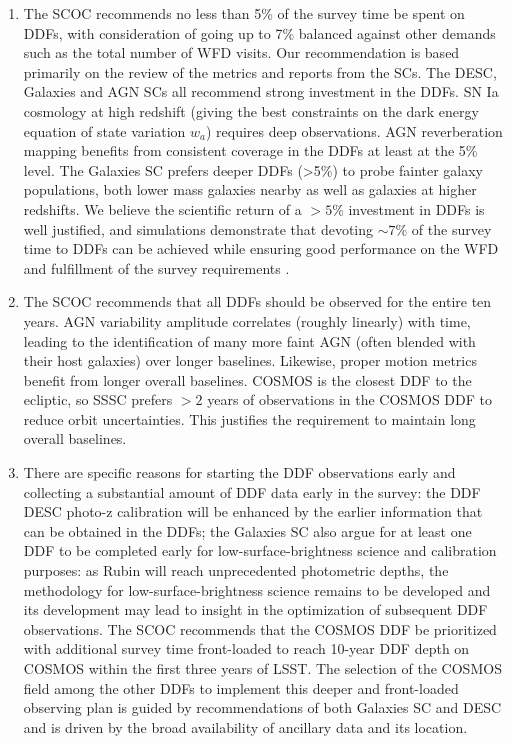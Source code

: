 \begin{enumerate} 
\item The SCOC recommends no less than 5\% of the survey time be spent on DDFs, with consideration of going up to 7\% balanced against other demands such as the total number of WFD visits. Our recommendation is based primarily on the review of the metrics and reports from the SCs. The DESC, Galaxies and AGN SCs all recommend strong investment in the DDFs. SN Ia cosmology at high redshift (giving the best constraints on the dark energy equation of state variation $w_a$) requires deep observations. AGN reverberation mapping benefits from consistent coverage in the DDFs at least at the 5\% level. The Galaxies SC prefers deeper DDFs (>5\%) to probe fainter galaxy populations, both lower mass galaxies nearby as well as galaxies at higher redshifts. We believe the scientific return of a $>5\%$ investment in DDFs is well justified, and simulations demonstrate that devoting $\sim7\%$ of the survey time to DDFs can be achieved while ensuring good performance on the WFD and fulfillment of the survey requirements .

\item The SCOC recommends that all DDFs should be observed for the entire ten years. AGN variability amplitude correlates (roughly linearly) with time, leading to the identification of many more faint AGN (often blended with their host galaxies) over longer baselines. Likewise, proper motion metrics benefit from longer overall baselines. COSMOS is the closest DDF to the ecliptic, so SSSC prefers $>2$ years of observations in the COSMOS DDF to reduce orbit uncertainties. 
This justifies the requirement to maintain long overall baselines.


\item There are specific reasons for starting the DDF observations early and collecting a substantial amount of DDF data early in the survey: the DDF DESC photo-z calibration will be enhanced by the earlier information that can be obtained in the DDFs; the Galaxies SC also argue for at least one DDF to be completed early for low-surface-brightness science and calibration purposes: as Rubin will reach unprecedented photometric depths, the methodology for low-surface-brightness science remains to be developed and its development may lead to insight in the optimization of subsequent DDF observations. 
The SCOC recommends that the COSMOS DDF be prioritized with additional survey time front-loaded to reach 10-year DDF depth on COSMOS within the first three years of LSST. The selection of the COSMOS field among the other DDFs to implement this deeper and front-loaded observing plan is guided by recommendations of both Galaxies SC and DESC and is driven by the broad availability of ancillary data and its location.




\end{enumerate}
